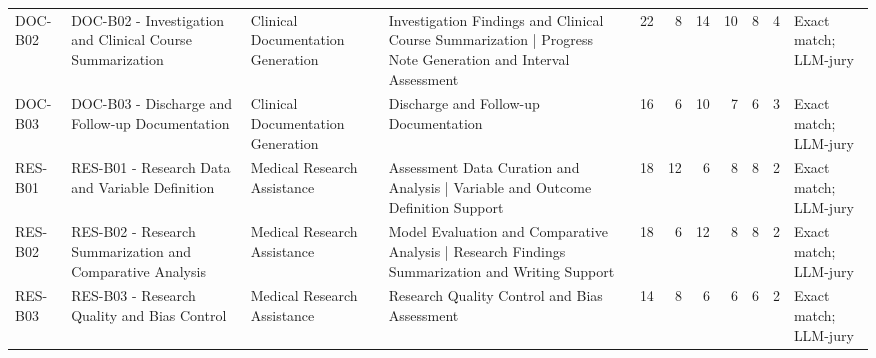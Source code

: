 \begin{tabular}{llllrrrrrrl}
DOC-B02 & DOC-B02 - Investigation and Clinical Course Summarization & Clinical Documentation Generation & Investigation Findings and Clinical Course Summarization | Progress Note Generation and Interval Assessment & 22 & 8 & 14 & 10 & 8 & 4 & Exact match; LLM-jury \\
DOC-B03 & DOC-B03 - Discharge and Follow-up Documentation & Clinical Documentation Generation & Discharge and Follow-up Documentation & 16 & 6 & 10 & 7 & 6 & 3 & Exact match; LLM-jury \\
RES-B01 & RES-B01 - Research Data and Variable Definition & Medical Research Assistance & Assessment Data Curation and Analysis | Variable and Outcome Definition Support & 18 & 12 & 6 & 8 & 8 & 2 & Exact match; LLM-jury \\
RES-B02 & RES-B02 - Research Summarization and Comparative Analysis & Medical Research Assistance & Model Evaluation and Comparative Analysis | Research Findings Summarization and Writing Support & 18 & 6 & 12 & 8 & 8 & 2 & Exact match; LLM-jury \\
RES-B03 & RES-B03 - Research Quality and Bias Control & Medical Research Assistance & Research Quality Control and Bias Assessment & 14 & 8 & 6 & 6 & 6 & 2 & Exact match; LLM-jury \\
\bottomrule
\end{tabular}
